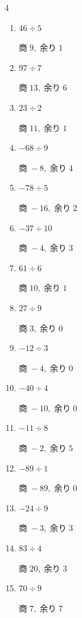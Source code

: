 \begin{multicols}{4}
\begin{enumerate}
        $商\; 17,\; 余り\; 0$

  \item $46 \div 5$

        $商\; 9,\; 余り\; 1$

  \item $97 \div 7$

        $商\; 13,\; 余り\; 6$

  \item $23 \div 2$

        $商\; 11,\; 余り\; 1$

  \item $-68 \div 9$

        $商\; -8,\; 余り\; 4$

  \item $-78 \div 5$

        $商\; -16,\; 余り\; 2$

  \item $-37 \div 10$

        $商\; -4,\; 余り\; 3$

  \item $61 \div 6$

        $商\; 10,\; 余り\; 1$

  \item $27 \div 9$

        $商\; 3,\; 余り\; 0$

  \item $-12 \div 3$

        $商\; -4,\; 余り\; 0$

  \item $-40 \div 4$

        $商\; -10,\; 余り\; 0$

  \item $-11 \div 8$

        $商\; -2,\; 余り\; 5$

  \item $-89 \div 1$

        $商\; -89,\; 余り\; 0$

  \item $-24 \div 9$

        $商\; -3,\; 余り\; 3$

  \item $83 \div 4$

        $商\; 20,\; 余り\; 3$

  \item $70 \div 9$

        $商\; 7,\; 余り\; 7$


\end{enumerate}
\end{multicols}
